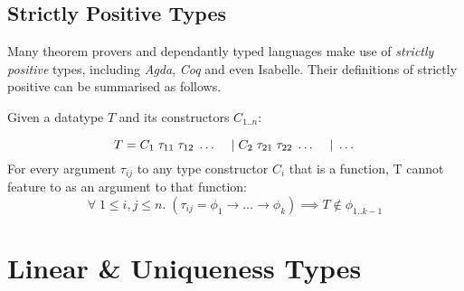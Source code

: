 
\subsection{Strictly Positive Types}

Many theorem provers and dependantly typed languages make use of \textit{strictly positive} types, including 
\textit{Agda}\cite{AgdaStrictlyPositive}, \textit{Coq}\cite{CoqStrictlyPositive} and even
Isabelle\cite{IsabelleStrictlyPositive}. Their definitions of strictly positive can be summarised as follows.

Given a datatype $T$ and its constructors $C_{1..n}$:

$$
T = C_1\; \tau_{11} \; \tau_{12} \; \dots \\
\hspace{1.2em} \vert\; C_2\; \tau_{21} \; \tau_{22} \; \dots \\
\hspace{1.2em} \vert\; \dots
$$
For every argument $\tau_{ij}$ to any type constructor $C_i$ that is a function,
T cannot feature to as an argument to that function:
$$
\forall\; 1 \leq i,j \leq n.\;
 (\tau_{ij} = \phi_{1} \rightarrow \dots \rightarrow \phi_{k})
 \implies T \notin \phi_{1..k-1}
$$


\section{Linear \& Uniqueness Types}
